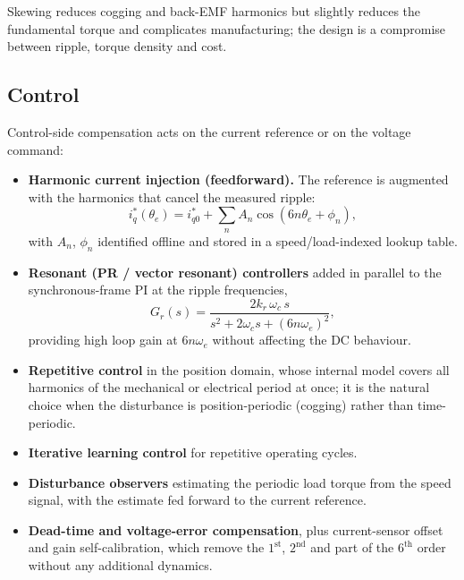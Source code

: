 \documentclass[11pt,a4paper]{article}
\newcommand{\thetae}{\theta_{e}}
\begin{document}
Skewing reduces cogging and back-EMF harmonics but slightly reduces the
fundamental torque and complicates manufacturing; the design is a compromise
between ripple, torque density and cost.

\subsection{Control}

Control-side compensation acts on the current reference or on the voltage
command:

\begin{itemize}
\item \textbf{Harmonic current injection (feedforward).} The reference is
      augmented with the harmonics that cancel the measured ripple:
      \begin{equation}
      i_{q}^{*}(\thetae)=i_{q0}^{*}+\sum_{n}A_{n}\cos(6n\thetae+\phi_{n}),
      \end{equation}
      with $A_{n}$, $\phi_{n}$ identified offline and stored in a
      speed/load-indexed lookup table.
\item \textbf{Resonant (PR / vector resonant) controllers} added in parallel to
      the synchronous-frame PI at the ripple frequencies,
      \begin{equation}
      G_{r}(s)=\frac{2k_{r}\,\omega_{c}\,s}{s^{2}+2\omega_{c}s+(6n\omega_{e})^{2}},
      \end{equation}
      providing high loop gain at $6n\omega_{e}$ without affecting the DC
      behaviour.
\item \textbf{Repetitive control} in the position domain, whose internal model
      covers all harmonics of the mechanical or electrical period at once; it is
      the natural choice when the disturbance is position-periodic (cogging)
      rather than time-periodic.
\item \textbf{Iterative learning control} for repetitive operating cycles.
\item \textbf{Disturbance observers} estimating the periodic load torque from
      the speed signal, with the estimate fed forward to the current reference.
\item \textbf{Dead-time and voltage-error compensation}, plus current-sensor
      offset and gain self-calibration, which remove the $1^{\text{st}}$,
      $2^{\text{nd}}$ and part of the $6^{\text{th}}$ order without any
      additional dynamics.
\end{itemize}
\end{document}
